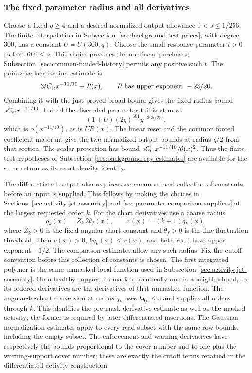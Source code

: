 \subsubsection{The fixed parameter radius and all derivatives}
Choose a fixed $q\ge4$ and a desired normalized output allowance
$0<s\le1/256$. The finite interpolation in
Subsection~\ref{sec:background-test-prices}, with degree $300$, has a
constant $U=U(300,q)$. Choose the small response parameter $t>0$
so that $6Ut\le s$. This choice precedes the nonlinear purchases;
Subsection~\ref{sec:common-funded-history} permits any positive such $t$.
The pointwise localization estimate is
\[
       3tC_{\rm st}x^{-11/10}+R(x),
       \qquad R\text{ has upper exponent }-23/20.
\]
Combining it with the just-proved broad bound gives the fixed-radius
bound $sC_{\rm st}x^{-11/10}$. Indeed the discarded parameter tail
is at most
\[
        (1+U)(2q)^{301}y^{-365/256},
\]
which is $o(x^{-11/10})$, as is $UR(x)$. The linear reset and the
common forced coefficient majorant give the two normalized output
bounds at radius $q/2$ from that section. The scalar projection has
bound $sC_{\rm st}x^{-11/10}/\theta(x)^2$. Thus the finite-test
hypotheses of Subsection~\ref{sec:background-ray-estimates} are available
for the same return as its exact density identity.

The differentiated output also requires one common local collection
of constants before an input is supplied. This follows by making the
choices in Sections~\ref{sec:activity-jet-assembly} and
\ref{sec:parameter-comparison-suppliers} at the largest requested
order $k$. For the chart derivatives use a coarse radius
\[
 q_k(x)=Z_k\,2\theta_f(x),\qquad v(x)=(k+1)q_k(x),
\]
where $Z_k>0$ is the fixed angular chart constant and $\theta_f>0$
is the fine fluctuation threshold. Then $v(x)>0$, $kq_k(x)\le v(x)$,
and both radii have upper exponent $-1/2$. The comparison estimates allow any such
radius. Fix the cutoff convention before this collection of
constants is chosen. The first integrated polymer is the same
unmasked local function used in Subsection~\ref{sec:activity-jet-assembly}.
On a healthy support its mask is identically one in a neighborhood,
so its ordered derivatives are the derivatives of that unmasked
function. The angular-to-chart conversion at radius $q_k$ uses
$kq_k\le v$ and supplies all orders through $k$. This identifies
the pre-mask derivative estimate as well as the masked activity;
the former is required by later differentiated insertions. The Gaussian normalization estimates apply to every read
subset with the same row bounds, including the empty subset.
The enforcement and warning derivatives have respectively the
bounds proportional to the cover number and to one plus the
warning-support cover number; these are exactly the cutoff terms
retained in the differentiated activity construction.

